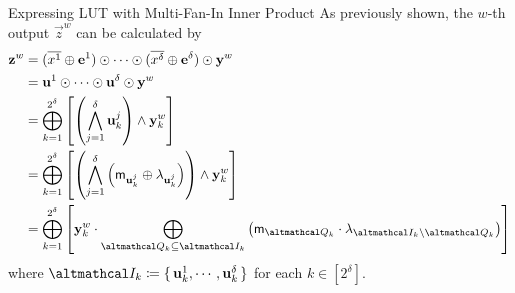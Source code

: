 \documentclass[../240906_cryptlab_flute.tex]{subfiles}
\begin{document}
\begin{frame}{Expressing LUT with Multi-Fan-In Inner Product}
    As previously shown, the \(w\)-th output \(\vec{z}^w\) can be calculated by
    \begin{align*}
        \vec{z}^w
        &= (\ol{x^1} \oplus \vec{e}^1) \odot \cdots \odot (\ol{x^\delta} \oplus \vec{e}^\delta) \odot \vec{y}^w \\
        &= \vec{u}^1 \odot \cdots \odot \vec{u}^\delta \odot \vec{y}^w \\
        &= \bigoplus_{k=1}^{2^\delta} \left[ \left(\bigwedge_{j=1}^\delta \vec{u}^j_k\right) \wedge \vec{y}^w_k \right] \\
        &= \bigoplus_{k=1}^{2^\delta} \left[
            \left(\bigwedge_{j=1}^\delta \left( \msf{m}_{\vec{u}^j_k} \oplus \lambda_{\vec{u}^j_k} \right) \right)
            \wedge \vec{y}^w_k \right] \\
        &= \bigoplus_{k=1}^{2^\delta} \left[\vec{y}^w_k \cdot \bigoplus_{\mcal{Q}_k \subseteq \mcal{I}_k}
            \big(\msf{m}_{\mcal{Q}_k} \cdot \lambda_{\mcal{I}_k \setminus \mcal{Q}_k} \big)\right]
    \end{align*}
    where \(\mcal{I}_k \coloneqq \{\,\vec{u}^1_k, \cdots, \vec{u}^\delta_k\,\}\)
    for each \(k \in [2^\delta]\).
\end{frame}
\end{document}
